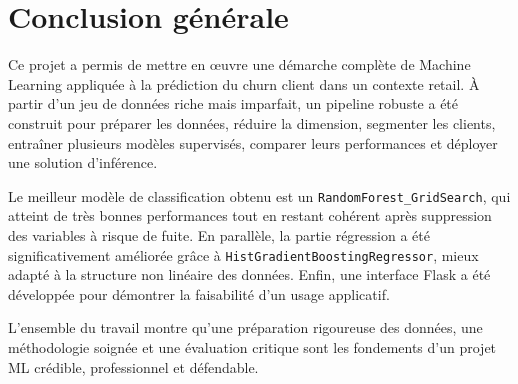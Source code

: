\documentclass[11pt,a4paper]{article}
\begin{document}
\section{Conclusion générale}

Ce projet a permis de mettre en œuvre une démarche complète de Machine Learning appliquée à la prédiction du churn client dans un contexte retail. À partir d’un jeu de données riche mais imparfait, un pipeline robuste a été construit pour préparer les données, réduire la dimension, segmenter les clients, entraîner plusieurs modèles supervisés, comparer leurs performances et déployer une solution d’inférence.

Le meilleur modèle de classification obtenu est un \texttt{RandomForest\_GridSearch}, qui atteint de très bonnes performances tout en restant cohérent après suppression des variables à risque de fuite. En parallèle, la partie régression a été significativement améliorée grâce à \texttt{HistGradientBoostingRegressor}, mieux adapté à la structure non linéaire des données. Enfin, une interface Flask a été développée pour démontrer la faisabilité d’un usage applicatif.

L’ensemble du travail montre qu’une préparation rigoureuse des données, une méthodologie soignée et une évaluation critique sont les fondements d’un projet ML crédible, professionnel et défendable.
\end{document}
